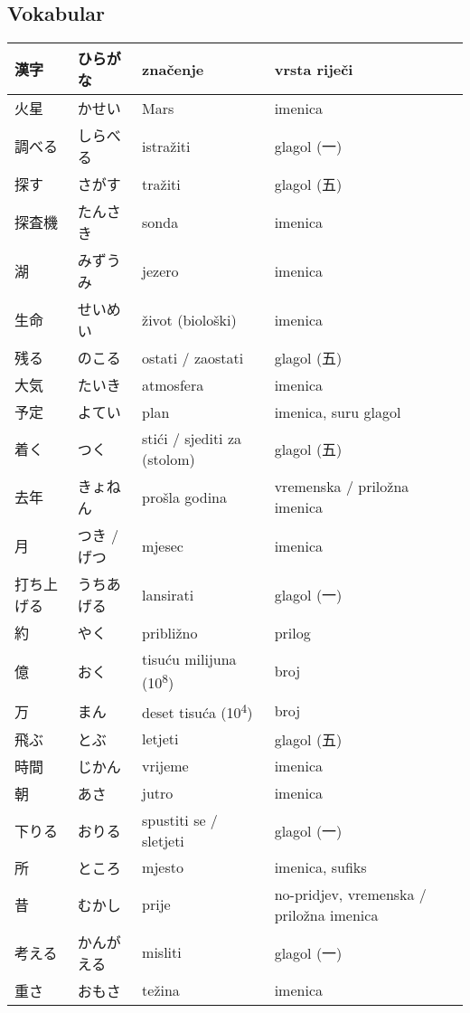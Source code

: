 \documentclass[a5paper,10pt]{tekst}
\begin{document}
	\subsection*{Vokabular}
	\renewcommand{\arraystretch}{1.333}
	\begin{xltabular}{\linewidth}{>{\Large}l>{\Large}ll>{\raggedright\arraybackslash}X}
		\toprule
		\textbf{漢字} & \textbf{ひらがな} & \textbf{značenje} & \textbf{vrsta riječi} \\
		\midrule
\endhead
		火星 & かせい & Mars & imenica \\
		調べる & しらべる & istražiti & glagol (一) \\
		探す & さがす & tražiti & glagol (五) \\
		探査機 & たんさき & sonda & imenica \\
		湖 & みずうみ & jezero & imenica \\
		生命 & せいめい & život (biološki) & imenica \\
		残る & のこる & ostati / zaostati & glagol (五) \\
		大気 & たいき & atmosfera & imenica \\
		予定 & よてい & plan & imenica, suru glagol \\
		着く & つく & stići / sjediti za (stolom) & glagol (五) \\
		去年 & きょねん & prošla godina & vremenska / priložna imenica \\
		月 & つき / げつ & mjesec & imenica \\
		打ち上げる & うちあげる & lansirati & glagol (一) \\
		約 & やく & približno & prilog \\
		億 & おく & tisuću milijuna (10\textsuperscript{8}) & broj \\
		万 & まん & deset tisuća (10\textsuperscript{4}) & broj \\
		飛ぶ & とぶ & letjeti & glagol (五) \\
		時間 & じかん & vrijeme & imenica \\
		朝 & あさ & jutro & imenica \\
		下りる & おりる & spustiti se / sletjeti & glagol (一) \\
		所 & ところ & mjesto & imenica, sufiks \\
		昔 & むかし & prije & no-pridjev, vremenska / priložna imenica \\
		考える & かんがえる & misliti & glagol (一) \\
		重さ & おもさ & težina & imenica \\

\end{xltabular}
\end{document}
